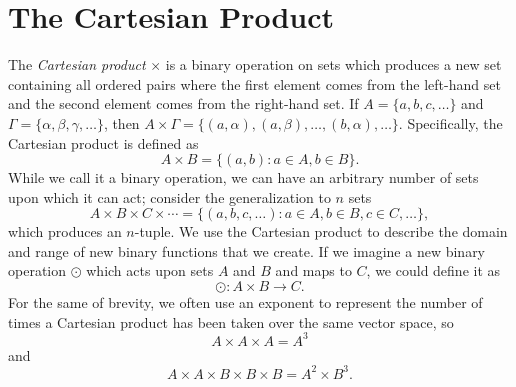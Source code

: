 \chapter{The Cartesian Product}
The \emph{Cartesian product} $\times$ is a binary operation on sets which produces a new set containing all ordered pairs where the first element comes from the left-hand set and the second element comes from the right-hand set. If $A = \{a,b,c,\dots\}$ and $\Gamma = \{\alpha,\beta,\gamma,\dots\}$, then $A \times \Gamma = \{(a,\alpha), (a,\beta), \dots, (b,\alpha), \dots\}$.
Specifically, the Cartesian product is defined as
\[ A \times B = \{(a,b) : a \in A, b \in B\}. \]
While we call it a binary operation, we can have an arbitrary number of sets upon which it can act; consider the generalization to $n$ sets
\[ A \times B \times C \times \cdots = \{(a,b,c,\dots) : a \in A, b \in B, c \in C, \dots\}, \]
which produces an $n$-tuple. 
We use the Cartesian product to describe the domain and range of new binary functions that we create. If we imagine a new binary operation $\odot$ which acts upon sets $A$ and $B$ and maps to $C$, we could define it as
\[ \odot : A \times B \to C. \]
For the same of brevity, we often use an exponent to represent the number of times a Cartesian product has been taken over the same vector space, so
\[ A \times A \times A = A^3 \]
and
\[A  \times A \times B \times B \times B = A^2 \times B^3. \]
